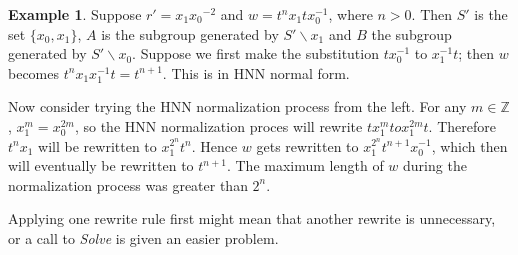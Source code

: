 \documentclass[11pt]{article} %
\theoremstyle{definition}
\theoremstyle{definition}
\theoremstyle{definition}
\theoremstyle{definition}
\theoremstyle{definition}
\theoremstyle{definition}
\newtheorem{exmpl}{Example}[theorem]
\begin{document}
\begin{exmpl}\label{ltrbad}
Suppose $r' = {x_1}{x_0}^{-2}$ and
$w = t^n x_1 t x_0^{-1}$, where $n > 0$.
Then $S'$ is the set $\{x_0, x_1\}$,
$A$ is the subgroup generated by $S' \backslash x_1$ and
$B$ the subgroup generated by $S' \backslash x_0$.
Suppose we first make the substitution $tx_0^{-1}$ to $x_1^{-1} t$;
then $w$ becomes $t^{n}x_1x_1^{-1}t = t^{n+1}$.
This is in HNN normal form.

Now consider trying the HNN normalization process from the left.
For any $m \in \mathbb{Z}$, $x_1^m = x_0^{2m}$,
so the HNN normalization proces will rewrite $tx_1^m to x_1^{2m}t$.
Therefore $t^nx_1$ will be rewritten to $x_1^{2^n}t^n$.
Hence $w$ gets rewritten to $x_1^{2^n} t^{n+1} x_0^{-1}$,
which then will eventually be rewritten to $t^{n+1}$. The maximum length
of $w$ during the normalization process was greater than $2^n$.
\end{exmpl}

Applying one rewrite rule first
might mean that another rewrite is unnecessary, or a call to \textit{Solve} is
given an easier problem.
\end{document}
